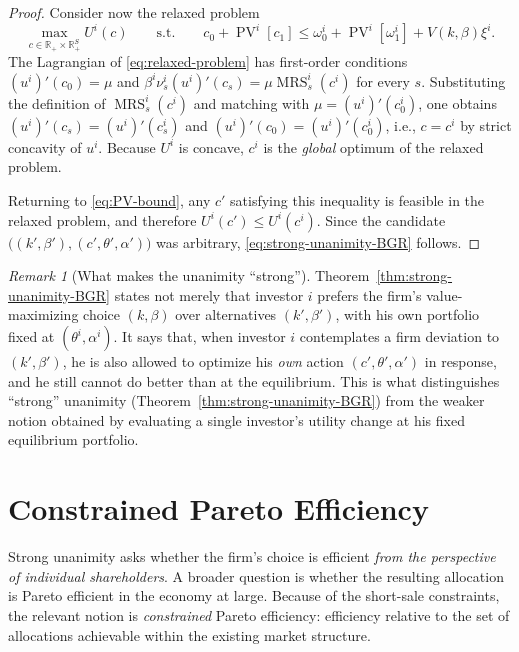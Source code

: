 \documentclass[11pt,a4paper,oneside]{book}
\def\R{\mathbb{R}}
\def\leq{\leqslant}
\DeclareMathOperator{\MRS}{MRS}
\DeclareMathOperator{\PV}{PV}
\theoremstyle{plain}
\theoremstyle{definition}
\theoremstyle{remark}
\newtheorem{remark}[theorem]{Remark}
\numberwithin{equation}{chapter}
\begin{document}
\begin{proof}
Consider now the relaxed problem
\begin{equation}\label{eq:relaxed-problem}
  \max_{c \in \R_+ \times \R_+^S} U^i(c)
  \qquad \text{s.t.} \qquad
  c_0 + \PV^i[c_1] \leq \omega^i_0 + \PV^i[\omega^i_1] + V(k, \beta) \xi^i.
\end{equation}
The Lagrangian of \eqref{eq:relaxed-problem} has first-order conditions $(u^i)'(c_0) = \mu$ and $\beta^i \nu^i_s (u^i)'(c_s) = \mu \MRS^i_s(c^i)$ for every $s$.
Substituting the definition of $\MRS^i_s(c^i)$ and matching with $\mu = (u^i)'(c^i_0)$, one obtains $(u^i)'(c_s) = (u^i)'(c^i_s)$ and $(u^i)'(c_0) = (u^i)'(c^i_0)$, i.e., $c = c^i$ by strict concavity of $u^i$.
Because $U^i$ is concave, $c^i$ is the \emph{global} optimum of the relaxed problem.

Returning to \eqref{eq:PV-bound}, any $c'$ satisfying this inequality is feasible in the relaxed problem, and therefore $U^i(c') \leq U^i(c^i)$.
Since the candidate $\bigl( (k', \beta'), (c', \theta', \alpha') \bigr)$ was arbitrary, \eqref{eq:strong-unanimity-BGR} follows.
\end{proof}

\begin{remark}[What makes the unanimity ``strong'']\label{rem:why-strong}
Theorem~\ref{thm:strong-unanimity-BGR} states not merely that investor $i$ prefers the firm's value-maximizing choice $(k, \beta)$ over alternatives $(k', \beta')$, with his own portfolio fixed at $(\theta^i, \alpha^i)$.
It says that, when investor $i$ contemplates a firm deviation to $(k', \beta')$, he is also allowed to optimize his \emph{own} action $(c', \theta', \alpha')$ in response, and he still cannot do better than at the equilibrium.
This is what distinguishes ``strong'' unanimity (Theorem~\ref{thm:strong-unanimity-BGR}) from the weaker notion obtained by evaluating a single investor's utility change at his fixed equilibrium portfolio.
\end{remark}

\section{Constrained Pareto Efficiency}
\label{sec:constrained-efficiency}

Strong unanimity asks whether the firm's choice is efficient \emph{from the perspective of individual shareholders}.
A broader question is whether the resulting allocation is Pareto efficient in the economy at large.
Because of the short-sale constraints, the relevant notion is \emph{constrained} Pareto efficiency: efficiency relative to the set of allocations achievable within the existing market structure.
\end{document}

